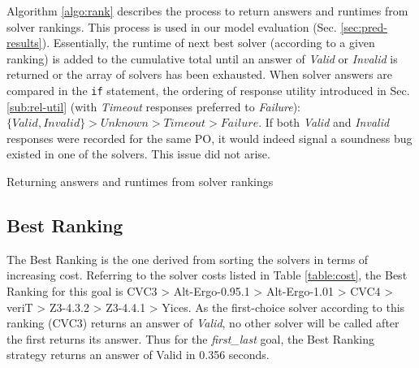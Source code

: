 Algorithm \ref{algo:rank} describes the process to return answers and runtimes from solver rankings. This process is used in our model evaluation (Sec. \ref{sec:pred-results}).
Essentially, the runtime of next best solver (according to a given ranking) is added to the cumulative total until an answer of \textit{Valid} or \textit{Invalid} is returned or the array of solvers has been exhausted. 
When solver answers are compared in the \texttt{if} statement, the ordering of response utility introduced in Sec. \ref{sub:rel-util} (with \textit{Timeout} responses preferred to \textit{Failure}): $\lbrace Valid, Invalid \rbrace > Unknown > Timeout > Failure$.
If both \textit{Valid} and \textit{Invalid} responses were recorded for the same PO, it would indeed signal a soundness bug existed in one of the solvers.
This issue did not arise.  

\begin{algorithm}
	\caption{Returning answers and runtimes from solver rankings}
	\label{algo:rank}
	
\end{algorithm}


\subsection{\textsf{Best Ranking}}
\label{sub:best}

The \textsf{Best Ranking} is the one derived from sorting the solvers in terms of increasing cost. 
Referring to the solver costs listed in Table \ref{table:cost}, the \textsf{Best Ranking} for this goal is
CVC3 > Alt-Ergo-0.95.1 > Alt-Ergo-1.01 > CVC4 > veriT > Z3-4.3.2 > Z3-4.4.1 > Yices. 
As the first-choice solver according to this ranking (CVC3) returns an answer of \textit{Valid}, no other solver will be called after the first returns its answer. 
Thus for the \textit{first\_last} goal, the \textsf{Best Ranking} strategy returns an answer of \textsf{Valid} in 0.356 seconds.   

